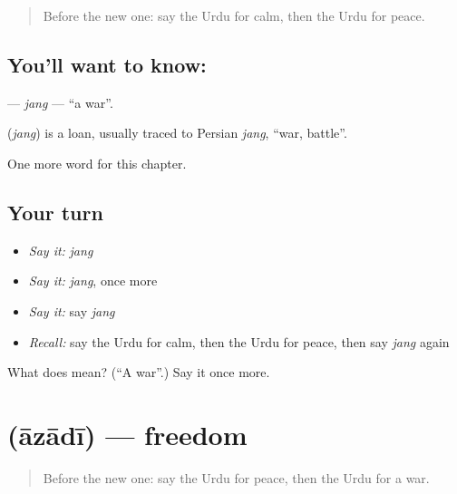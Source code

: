 \label{lesson:UR-C172-jang}



\begin{quote}
Before the new one: say the Urdu for calm, then the Urdu for peace.
\end{quote}

\subsection*{You'll want to know: }
\textbf{} — \emph{jang} — \textquotedblleft{}a war\textquotedblright{}.

\begin{cousinweb}
\textbf{} (\emph{jang}) is a loan, usually traced to Persian \emph{jang}, \textquotedblleft{}war, battle\textquotedblright{}.
\end{cousinweb}

\begin{grammarlens}[title={What you've built}]
One more word for this chapter.
\end{grammarlens}

\subsection*{Your turn}
\begin{itemize}
\raggedright
  \item \emph{Say it:} \emph{jang}
  \item \emph{Say it:} \emph{jang}, once more
  \item \emph{Say it:} say \emph{jang}
  \item \emph{Recall:} say the Urdu for calm, then the Urdu for peace, then say \emph{jang} again
\end{itemize}

\begin{tcolorbox}[breakable,colback=teal!4,colframe=teal!35!black,title={Before you move on}]
What does  mean? (\textquotedblleft{}A war\textquotedblright{}.) Say it once more.
\end{tcolorbox}
\section[\texorpdfstring{\ur{آزادی} (āzādī)}{آزادی (āzādī)}]{ (āzādī) — freedom}

\label{lesson:UR-C172-azadi}



\begin{quote}
Before the new one: say the Urdu for peace, then the Urdu for a war.
\end{quote}

